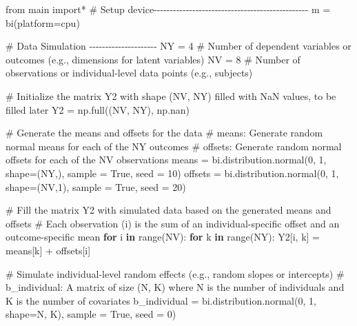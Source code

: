 \documentclass[
  letterpaper,
  DIV=11,
  numbers=noendperiod]{scrreprt}
\newenvironment{Shaded}{\begin{snugshade}}{\end{snugshade}}
\newcommand{\BuiltInTok}[1]{\textcolor[rgb]{0.00,0.23,0.31}{#1}}
\newcommand{\CommentTok}[1]{\textcolor[rgb]{0.37,0.37,0.37}{#1}}
\newcommand{\ControlFlowTok}[1]{\textcolor[rgb]{0.00,0.23,0.31}{\textbf{#1}}}
\newcommand{\DecValTok}[1]{\textcolor[rgb]{0.68,0.00,0.00}{#1}}
\newcommand{\ImportTok}[1]{\textcolor[rgb]{0.00,0.46,0.62}{#1}}
\newcommand{\KeywordTok}[1]{\textcolor[rgb]{0.00,0.23,0.31}{\textbf{#1}}}
\newcommand{\NormalTok}[1]{\textcolor[rgb]{0.00,0.23,0.31}{#1}}
\newcommand{\OperatorTok}[1]{\textcolor[rgb]{0.37,0.37,0.37}{#1}}
\newcommand{\StringTok}[1]{\textcolor[rgb]{0.13,0.47,0.30}{#1}}
\newcommand{\VariableTok}[1]{\textcolor[rgb]{0.07,0.07,0.07}{#1}}
\begin{document}
\begin{Shaded}
\begin{Highlighting}[]
\ImportTok{from}\NormalTok{ main }\ImportTok{import}\OperatorTok{*}
\CommentTok{\# Setup device{-}{-}{-}{-}{-}{-}{-}{-}{-}{-}{-}{-}{-}{-}{-}{-}{-}{-}{-}{-}{-}{-}{-}{-}{-}{-}{-}{-}{-}{-}{-}{-}{-}{-}{-}{-}{-}{-}{-}{-}{-}{-}{-}{-}{-}{-}{-}{-}}
\NormalTok{m }\OperatorTok{=}\NormalTok{ bi(platform}\OperatorTok{=}\StringTok{\textquotesingle{}cpu\textquotesingle{}}\NormalTok{)}

\CommentTok{\# Data Simulation {-}{-}{-}{-}{-}{-}{-}{-}{-}{-}{-}{-}{-}{-}{-}{-}{-}{-}{-}{-}{-}}
\NormalTok{NY }\OperatorTok{=} \DecValTok{4}  \CommentTok{\# Number of dependent variables or outcomes (e.g., dimensions for latent variables)}
\NormalTok{NV }\OperatorTok{=} \DecValTok{8}  \CommentTok{\# Number of observations or individual{-}level data points (e.g., subjects)}

\CommentTok{\# Initialize the matrix Y2 with shape (NV, NY) filled with NaN values, to be filled later}
\NormalTok{Y2 }\OperatorTok{=}\NormalTok{ np.full((NV, NY), np.nan)}

\CommentTok{\# Generate the means and offsets for the data}
\CommentTok{\# means: Generate random normal means for each of the NY outcomes}
\CommentTok{\# offsets: Generate random normal offsets for each of the NV observations}
\NormalTok{means }\OperatorTok{=}\NormalTok{ bi.distribution.normal(}\DecValTok{0}\NormalTok{, }\DecValTok{1}\NormalTok{, shape}\OperatorTok{=}\NormalTok{(NY,), sample }\OperatorTok{=} \VariableTok{True}\NormalTok{, seed }\OperatorTok{=} \DecValTok{10}\NormalTok{)}
\NormalTok{offsets }\OperatorTok{=}\NormalTok{ bi.distribution.normal(}\DecValTok{0}\NormalTok{, }\DecValTok{1}\NormalTok{, shape}\OperatorTok{=}\NormalTok{(NV,}\DecValTok{1}\NormalTok{), sample }\OperatorTok{=} \VariableTok{True}\NormalTok{, seed }\OperatorTok{=} \DecValTok{20}\NormalTok{)}

\CommentTok{\# Fill the matrix Y2 with simulated data based on the generated means and offsets}
\CommentTok{\# Each observation (i) is the sum of an individual{-}specific offset and an outcome{-}specific mean}
\ControlFlowTok{for}\NormalTok{ i }\KeywordTok{in} \BuiltInTok{range}\NormalTok{(NV):}
    \ControlFlowTok{for}\NormalTok{ k }\KeywordTok{in} \BuiltInTok{range}\NormalTok{(NY):}
\NormalTok{        Y2[i, k] }\OperatorTok{=}\NormalTok{ means[k] }\OperatorTok{+}\NormalTok{ offsets[i]}

\CommentTok{\# Simulate individual{-}level random effects (e.g., random slopes or intercepts)}
\CommentTok{\# b\_individual: A matrix of size (N, K) where N is the number of individuals and K is the number of covariates}
\NormalTok{b\_individual }\OperatorTok{=}\NormalTok{ bi.distribution.normal(}\DecValTok{0}\NormalTok{, }\DecValTok{1}\NormalTok{, shape}\OperatorTok{=}\NormalTok{N, K), sample }\OperatorTok{=} \VariableTok{True}\NormalTok{, seed }\OperatorTok{=} \DecValTok{0}\NormalTok{)}


\end{Highlighting}
\end{Shaded}
\end{document}
